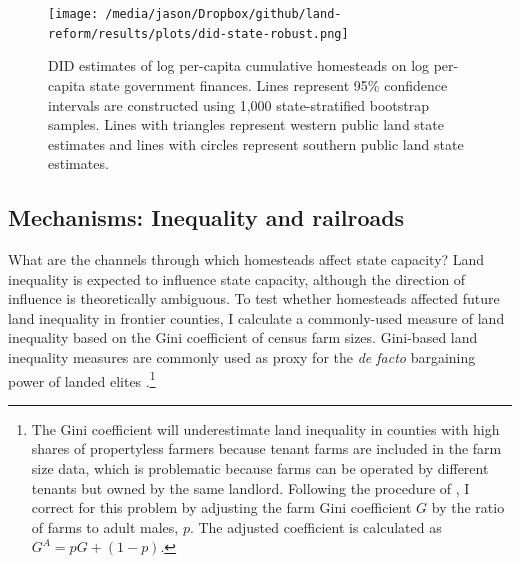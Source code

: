 \documentclass[12pt]{article}
\begin{document}
\begin{figure}[htbp]
	\begin{center}
		\texttt{[image: /media/jason/Dropbox/github/land-reform/results/plots/did-state-robust.png]}
	\end{center}
	\caption{DID estimates of log per-capita cumulative homesteads on log per-capita state government finances. Lines represent 95\% confidence intervals are constructed using 1,000 state-stratified bootstrap samples. Lines with triangles represent western public land state estimates and lines with circles represent southern public land state estimates.  \label{fig:did-state-robust}}
\end{figure}

%

\subsection{Mechanisms: Inequality and railroads}  \label{mechanisms}

What are the channels through which homesteads affect state capacity? Land inequality is expected to influence state capacity, although the direction of influence is theoretically ambiguous. To test whether homesteads affected future land inequality in frontier counties, I calculate a commonly-used measure of land inequality based on the Gini coefficient of census farm sizes. Gini-based land inequality measures are commonly used as proxy for the \emph{de facto} bargaining power of landed elites \citep[e.g.,][]{boix2003democracy,ziblatt2008does,ansell2015}.\footnote{The Gini coefficient will underestimate land inequality in counties with high shares of propertyless farmers because tenant farms are included in the farm size data, which is problematic because farms can be operated by different tenants but owned by the same landlord. Following the procedure of \citet{vollrath2013inequality}, I correct for this problem by adjusting the farm Gini coefficient $G$ by the ratio of farms to adult males, $p$. The adjusted coefficient is calculated as $G^A = p G + (1-p)$.}%
\end{document}
